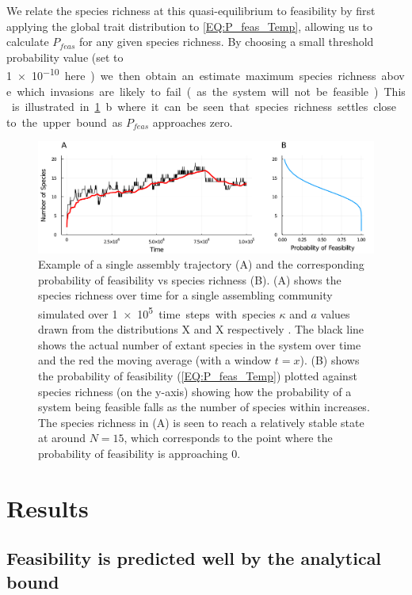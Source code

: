 \documentclass{article}
\begin{document}
We relate the species richness at this quasi-equilibrium to feasibility by first applying the global trait distribution to \cref{EQ:P_feas_Temp}, allowing us to calculate $P_{feas}$ for any given species richness. By choosing a small threshold probability value (set to \SI{1e-10} here) we then obtain an estimate maximum species richness above which invasions are likely to fail (as the system will not be feasible). This is illustrated in \cref{Fig:Assembly_Example}b where it can be seen that species richness settles close to the upper bound as $P_{feas}$ approaches zero.  

\begin{figure}
    \centering
    \includegraphics[width = \textwidth]{docs/Figures/Fig_3.pdf}
    \caption{Example of a single assembly trajectory (A) and the corresponding probability of feasibility vs species richness (B). (A) shows the species richness over time for a single assembling community simulated over \SI{1e5} time steps with species $\kappa$ and $a$ values drawn from the distributions X and X respectively . The black line shows the actual number of extant species in the system over time and the red the moving average (with a window $t = x$). (B) shows the probability of feasibility (\cref{EQ:P_feas_Temp}) plotted against species richness (on the y-axis) showing how the probability of a system being feasible falls as the number of species within increases. The species richness in (A) is seen to reach a relatively stable state at around $N = 15$, which corresponds to the point where the probability of feasibility is approaching $0$.   }
    \label{Fig:Assembly_Example}
\end{figure}

\section{Results}

\subsection{Feasibility is predicted well by the analytical bound}
\end{document}
